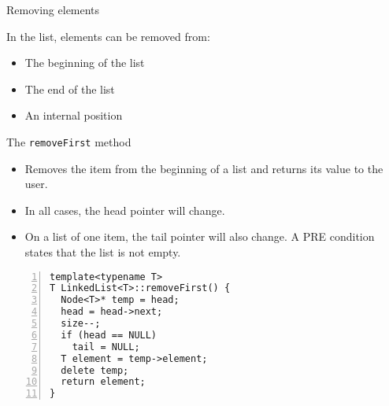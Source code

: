 \documentclass{beamer}
\begin{document}



\begin{frame}[fragile]{Removing elements}

In the list, elements can be removed from:

\begin{itemize}
\item The beginning of the list
\item The end of the list
\item An internal position
\end{itemize}

\end{frame}


\begin{frame}[fragile]{The \lstinline$removeFirst$ method}

\begin{itemize}
\item Removes the item from the beginning of a list and returns its
  value to the user.

\item In all cases, the head pointer will change.

\item On a list of one item, the tail pointer will also change. A PRE
  condition states that the list is not empty.
\end{itemize}

\begin{lstlisting}[numbers=left]
template<typename T>
T LinkedList<T>::removeFirst() {
  Node<T>* temp = head;
  head = head->next;
  size--;
  if (head == NULL)
    tail = NULL;
  T element = temp->element;
  delete temp;
  return element;
}
\end{lstlisting}

\end{frame}

\end{document}
